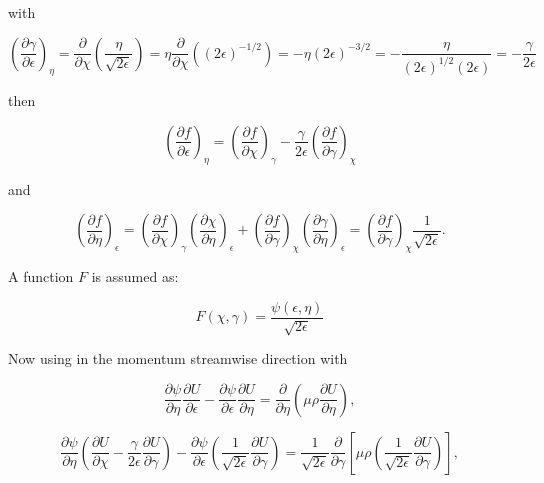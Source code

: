 with

\begin{equation}
\left(
\frac{\partial \gamma}{\partial \epsilon}
\right)_\eta
=
\frac{\partial }{\partial \chi}
\left(
    \frac{\eta}{\sqrt{2\epsilon}}
\right)
=
\eta
\frac{\partial }{\partial \chi}
\left(
    (2\epsilon)^{-1/2}
\right)
=
-
\eta
(2\epsilon)^{-3/2}
=
-
\frac{\eta}{(2\epsilon)^{1/2}(2\epsilon)}
=
-
\frac{\gamma}{2\epsilon}
\end{equation} 

then 

\begin{equation}
\left(
\frac{\partial f}{\partial \epsilon}
\right)_\eta
=
\left(
\frac{\partial f}{\partial \chi}
\right)_\gamma
-
\frac{\gamma}{2\epsilon}
\left(
\frac{\partial f}{\partial \gamma}
\right)_\chi
\end{equation} 

and 

\begin{equation}
\left(
\frac{\partial f}{\partial \eta}
\right)_\epsilon
=
\left(
\frac{\partial f}{\partial \chi}
\right)_\gamma
\left(
\frac{\partial \chi}{\partial \eta}
\right)_\epsilon
+
\left(
\frac{\partial f}{\partial \gamma}
\right)_\chi
\left(
\frac{\partial \gamma}{\partial \eta}
\right)_\epsilon
=
\left(
\frac{\partial f}{\partial \gamma}
\right)_\chi
\frac{1}{\sqrt{2\epsilon}}
.
\end{equation} 

A function $F$ is assumed as:

\begin{equation} 
F(\chi,\gamma)=\frac{\psi(\epsilon,\eta)}{\sqrt{2\epsilon}}
\end{equation} 

Now using in the momentum streamwise direction with 

\begin{equation*} 
\frac{\partial \psi}{\partial \eta}
\frac{\partial U}{\partial \epsilon}
-
\frac{\partial \psi}{\partial \epsilon}
\frac{\partial U}{\partial \eta}
=
\frac{\partial}{\partial \eta}
\left(\mu\rho\frac{\partial U}{\partial \eta}\right)
,
\end{equation*} 

\begin{equation*} 
\frac{\partial \psi}{\partial \eta}
\left(
    \frac{\partial U}{\partial \chi}
    -
    \frac{\gamma}{2\epsilon}
    \frac{\partial U}{\partial \gamma}
\right)
-
\frac{\partial \psi}{\partial \epsilon}
\left(
    \frac{1}{\sqrt{2\epsilon}}
    \frac{\partial U}{\partial \gamma}
\right)
=
\frac{1}{\sqrt{2\epsilon}}
\frac{\partial}{\partial \gamma}
\left[
    \mu\rho
    \left(
    \frac{1}{\sqrt{2\epsilon}}
    \frac{\partial U}{\partial \gamma}
    \right)
\right]
,
\end{equation*} 

